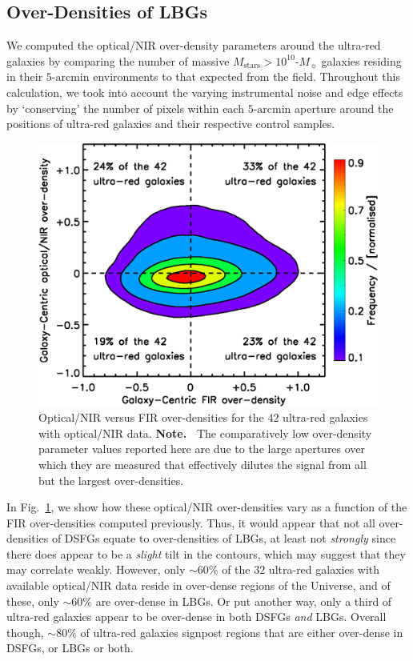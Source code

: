 \documentclass[a4paper, fleqn, usenatbib]{mnras}
\newcommand{\msol}{M_{\sun}}
\newcommand{\mstars}{M_{\text{stars}}}
\newcommand{\urgs}{ultra-red galaxies}
\begin{document}
\subsection{Over-Densities of LBGs}

We computed the optical/NIR over-density parameters around the \urgs{} by comparing the number of massive $\mstars{}>10^{10}\text{-}\msol{}$ galaxies residing in their $5\text{-}\text{arcmin}$ environments to that expected from the field.
Throughout this calculation, we took into account the varying instrumental noise and edge effects by `conserving' the number of pixels within each $5\text{-}\text{arcmin}$ aperture around the positions of \urgs{} and their respective control samples.

\begin{figure}
    \includegraphics[width=1.25\columnwidth]{delta_nir_vs_fir}
    \caption{Optical/NIR versus FIR over-densities for the $42$ \urgs{} with optical/NIR data.
    \textbf{Note.\ } The comparatively low over-density parameter values reported here are due to the large apertures over which they are measured that effectively dilutes the signal from all but the largest over-densities.}
    \label{fig:delta_nir_vs_fir}
\end{figure}


In Fig.~\ref{fig:delta_nir_vs_fir}, we show how these optical/NIR over-densities vary as a function of the FIR over-densities computed previously.
Thus, it would appear that not all over-densities of DSFGs equate to over-densities of LBGs, at least not \emph{strongly} since there does appear to be a \emph{slight} tilt in the contours, which may suggest that they may correlate weakly.
However, only $\sim60\%$ of the $32$ \urgs{} with available optical/NIR data reside in over-dense regions of the Universe, and of these, only $\sim60\%$ are over-dense in LBGs.
Or put another way, only a third of \urgs{} appear to be over-dense in both DSFGs \emph{and} LBGs.
Overall though, $\sim80\%$ of \urgs{} signpost regions that are either over-dense in DSFGs, or LBGs or both.
\end{document}
